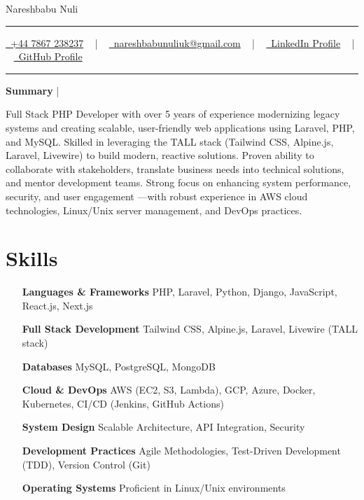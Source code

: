 \documentclass[letterpaper,10pt]{article}
\newcommand{\documentTitle}[2]{
  \begin{center}
    {\Huge\color{accentTitle} #1}
    \vspace{10pt}
    {\color{accentLine} \hrule}
    \vspace{2pt}
    \footnotesize{#2}
    \vspace{2pt}
    {\color{accentLine} \hrule}
  \end{center}
}
\newcommand{\tinysection}[1]{
  \phantomsection
  \addcontentsline{toc}{section}{#1}
  {\large{\bfseries\color{accentText}#1} {\color{accentLine} |}}
}
\begin{document}

  \documentTitle{Nareshbabu Nuli}{
    \href{tel:+447867238237}{
      \raisebox{-0.05\height} \faPhone\ +44 7867 238237} ~ | ~
    \href{mailto:nareshbabunuliuk@gmail.com}{
      \raisebox{-0.15\height} \faEnvelope\ nareshbabunuliuk@gmail.com} ~ | ~
    \href{https://linkedin.com/in/USER/}{
      \raisebox{-0.15\height} \faLinkedin\ LinkedIn Profile} ~ | ~
    \href{https://github.com/USER}{
      \raisebox{-0.15\height} \faGithub\ GitHub Profile}
  }


  \tinysection{Summary}
  Full Stack PHP Developer with over 5 years of experience modernizing legacy systems and creating scalable, user-friendly web applications using Laravel, PHP, and MySQL. Skilled in leveraging the TALL stack (Tailwind CSS, Alpine.js, Laravel, Livewire) to build modern, reactive solutions. Proven ability to collaborate with stakeholders, translate business needs into technical solutions, and mentor development teams. Strong focus on enhancing system performance, security, and user engagement —with robust experience in AWS cloud technologies, Linux/Unix server management, and DevOps practices.


  \section{Skills}

  \begin{multicols}{2}
    \begin{itemize}[itemsep=-2px, parsep=1pt, leftmargin=75pt]
      \item[\textbf{Languages \& Frameworks}] PHP, Laravel, Python, Django, JavaScript, React.js, Next.js
      \item[\textbf{Full Stack Development}] Tailwind CSS, Alpine.js, Laravel, Livewire (TALL stack)
      \item[\textbf{Databases}] MySQL, PostgreSQL, MongoDB
      \item[\textbf{Cloud \& DevOps}] AWS (EC2, S3, Lambda), GCP, Azure, Docker, Kubernetes, CI/CD (Jenkins, GitHub Actions)
      \item[\textbf{System Design}] Scalable Architecture, API Integration, Security
      \item[\textbf{Development Practices}] Agile Methodologies, Test-Driven Development (TDD), Version Control (Git)
      \item[\textbf{Operating Systems}] Proficient in Linux/Unix environments
    \end{itemize}
  \end{multicols}
\end{document}

